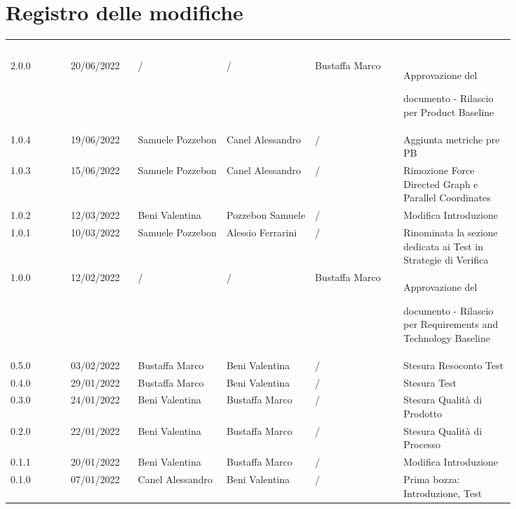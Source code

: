 \section*{Registro delle modifiche}

{\renewcommand{\arraystretch}{1.5}
\scriptsize
\begin{tabular}{p{0.10\linewidth}p{0.10\linewidth}p{0.15\linewidth}p{0.15\linewidth}p{0.15\linewidth}p{0.19\linewidth}}
	\rowcolor[RGB]{33, 73, 50}
	\textcolor{white}{\textbf{Versione}} & \textcolor{white}{\textbf{Data}} &
	\textcolor{white}{\textbf{Redattore}} & \textcolor{white}{\textbf{Verificatore}} &
	\textcolor{white}{\textbf{Approvatore}} & \textcolor{white}{\textbf{Descrizione}}\\
	\rowcolor[RGB]{233, 245, 206}
	2.0.0 & 20/06/2022 & / & / & Bustaffa Marco & Approvazione del \par documento - Rilascio per Product Baseline\\
	\rowcolor[RGB]{216, 235, 171}
	1.0.4 & 19/06/2022 &Samuele Pozzebon & Canel Alessandro & / & Aggiunta metriche pre PB\\
	\rowcolor[RGB]{233, 245, 206}
  1.0.3 & 15/06/2022 & Samuele Pozzebon & Canel Alessandro & / & Rimozione Force Directed Graph e Parallel Coordinates \\
	\rowcolor[RGB]{216, 235, 171}
	1.0.2 & 12/03/2022 & Beni Valentina & Pozzebon Samuele & / & Modifica Introduzione\\
	\rowcolor[RGB]{233, 245, 206}
  1.0.1 & 10/03/2022 & Samuele Pozzebon & Alessio Ferrarini & / & Rinominata la sezione dedicata ai Test in Strategie di Verifica\\
	\rowcolor[RGB]{216, 235, 171}
	1.0.0 & 12/02/2022 & / & / & Bustaffa Marco & Approvazione del \par documento - Rilascio per Requirements and Technology Baseline\\
	\rowcolor[RGB]{233, 245, 206}
	0.5.0 & 03/02/2022 & Bustaffa Marco & Beni Valentina & / & Stesura Resoconto Test\\
	\rowcolor[RGB]{216, 235, 171}
	0.4.0 & 29/01/2022 & Bustaffa Marco & Beni Valentina & / & Stesura Test\\
	\rowcolor[RGB]{233, 245, 206}
	0.3.0 & 24/01/2022 & Beni Valentina & Bustaffa Marco & / & Stesura Qualità di Prodotto\\
	\rowcolor[RGB]{216, 235, 171}
	0.2.0 & 22/01/2022 & Beni Valentina & Bustaffa Marco & / & Stesura Qualità di Processo\\
	\rowcolor[RGB]{233, 245, 206}
	0.1.1 & 20/01/2022 & Beni Valentina & Bustaffa Marco & / & Modifica Introduzione\\
	\rowcolor[RGB]{216, 235, 171}
	0.1.0 & 07/01/2022 & Canel Alessandro & Beni Valentina & / & Prima bozza: Introduzione, Test\\
	
	
	
	
	 
	
  	
\end{tabular}
}
